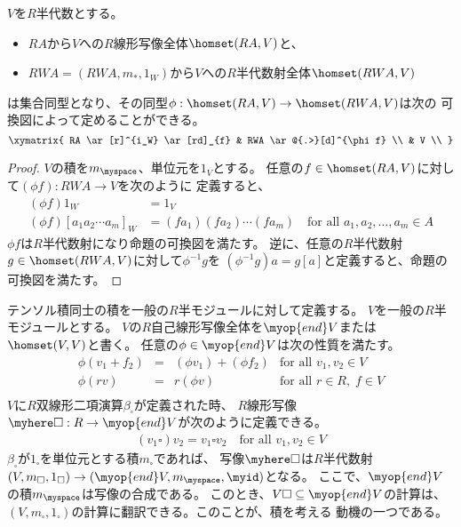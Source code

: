 	\begin{proposition}[自由半代数の普遍性]\label{prop:自由半代数の普遍性} %
		$V$を$R$半代数とする。
		\begin{itemize}\setlength{\itemsep}{-1mm} %
			\item $RA$から$V$への$R$線形写像全体$\homset(RA,V)$と、
			\item $RWA=(RWA,m_*,1_W)$から$V$への$R$半代数射全体$\homset(RWA,V)$
		\end{itemize} %
		は集合同型となり、その同型$\phi:\homset(RA,V)\to\homset(RWA,V)$は次の
		可換図によって定めることができる。
		\begin{equation*}\xymatrix{
			RA \ar[r]^{i_W} \ar[rd]_{f} & RWA \ar@{.>}[d]^{\phi f} \\
			& V \\
		}\end{equation*}
	\end{proposition} %
	\begin{proof} %
		$V$の積を$m_\myspace$、単位元を$1_V$とする。
		任意の$f\in\homset(RA,V)$に対して$(\phi f):RWA\to V$を次のように
		定義すると、
		\begin{equation*}\begin{split} %
			(\phi f)1_W &= 1_V \\
			(\phi f)[a_1a_2\cdots a_m]_W &= (fa_1)(fa_2)\cdots(fa_m)
			\quad\text{for all }a_1,a_2,\dots,a_m\in A
		\end{split}\end{equation*} %
		$\phi f$は$R$半代数射になり命題の可換図を満たす。
		逆に、任意の$R$半代数射$g\in\homset(RWA,V)$に対して$\phi^{-1}g$を
		$(\phi^{-1}g)a=g[a]$と定義すると、命題の可換図を満たす。
	\end{proof} %

	テンソル積同士の積を一般の$R$半モジュールに対して定義する。
	$V$を一般の$R$半モジュールとする。
	$V$の$R$自己線形写像全体を$\myop{end}V$または$\homset(V,V)$と書く。
	任意の$\phi\in\myop{end}V$は次の性質を満たす。
	\begin{equation*}\begin{array}{rcll} %
		\phi(v_1+f_2) &=& (\phi v_1) + (\phi f_2)
			&\text{for all } v_1,v_2\in V \\
		\phi(rv) &=& r(\phi v) &\text{for all }r\in R,\;f\in V \\
	\end{array}\end{equation*} %
	$V$に$R$双線形二項演算$\beta_\square$が定義された時、
	$R$線形写像$\myhere\square:R\to\myop{end}V$が次のように定義できる。
	\begin{equation*}\begin{split} %
		(v_1\square)v_2 = v_1\square v_2 \quad\text{for all } v_1,v_2\in V
	\end{split}\end{equation*} %
	$\beta_\square$が$1_\square$を単位元とする積$m_\square$であれば、
	写像$\myhere\square$は$R$半代数射
	$(V,m_\square,1_\square)\to(\myop{end}V,m_\myspace,\myid)$となる。
	ここで、$\myop{end}V$の積$m_\myspace$は写像の合成である。
	このとき、$V\square\subseteq\myop{end}V$の計算は、
	$(V,m_\square,1_\square)$の計算に翻訳できる。このことが、積を考える
	動機の一つである。

